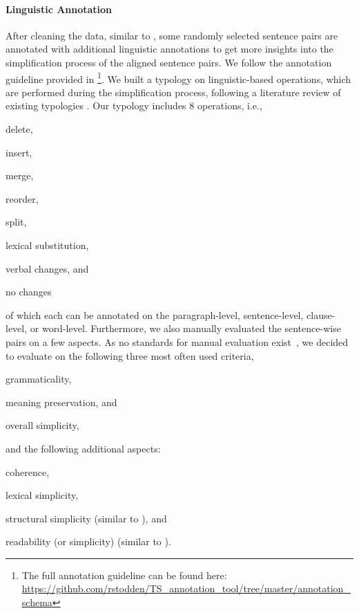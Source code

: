 \documentclass[11pt]{article}
\begin{document}
\paragraph{Linguistic Annotation}
After cleaning the data, similar to \cite{cardon-etal-2022-linguistic}, 
some randomly selected sentence pairs are annotated with additional linguistic annotations to get more insights into the simplification process of the aligned sentence pairs. We follow the annotation guideline provided in \citet{stodden-kallmeyer-2022-ts}\footnote{The full annotation guideline can be found here: \url{https://github.com/rstodden/TS_annotation_tool/tree/master/annotation_schema}}. We built a typology on linguistic-based operations, which are performed during the simplification process, following a literature review of existing typologies \citet{bott-saggion-2014-text,brunato-etal-2015-design,gonzalez-dios-etal-2018-corpus,koptient-etal-2019-simplification}. Our typology includes 8 operations, i.e., 
\begin{enumerate*}[label=\roman*)]
    \item delete,
    \item insert,
    \item merge,
    \item reorder,
    \item split,
    \item lexical substitution,
    \item verbal changes, and
    \item no changes
\end{enumerate*}
of which each can be annotated on the paragraph-level, sentence-level, clause-level, or word-level. Furthermore, we also manually evaluated the sentence-wise pairs on a few aspects. As no standards for manual evaluation exist~\cite{alva-manchego-etal-2020-data}, we decided to evaluate on the following three most often used criteria, 
\begin{enumerate*} [label=\roman*)]
    \item grammaticality, 
    \item meaning preservation, and  
    \item overall simplicity,
\end{enumerate*} and the following additional aspects:
\begin{enumerate*}[label=\roman*)]
    \setcounter{enumi}{3}
    \item coherence, 
    \item lexical simplicity,
    \item structural simplicity (similar to \citet{sulem-etal-2018-semantic}), and
    \item readability (or simplicity) (similar to \citet{brunato-etal-2018-sentence}).
\end{enumerate*} 
\end{document}
